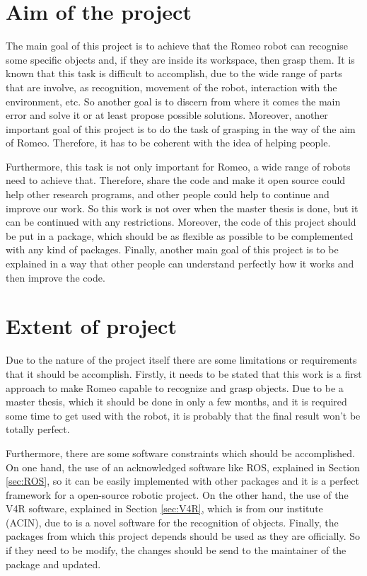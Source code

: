 \documentclass[12pt,a4paper,final,twoside,openright]{report}
\begin{document}
\section{Aim of the project}

The main goal of this project is to achieve that the Romeo robot can recognise some specific objects and, if they are inside its workspace, then grasp them. It is known that this task is difficult to accomplish, due to the wide range of parts that are involve, as recognition, movement of the robot, interaction with the environment, etc. So another goal is to discern from where it comes the main error and solve it or at least propose possible solutions. Moreover, another important goal of this project is to do the task of grasping in the way of the aim of Romeo. Therefore, it has to be coherent with the idea of helping people.

Furthermore, this task is not only important for Romeo, a wide range of robots need to achieve that. Therefore, share the code and make it open source could help other research programs, and other people could help to continue and improve our work. So this work is not over when the master thesis is done, but it can be continued with any restrictions. Moreover, the code of this project should be put in a package, which should be as flexible as possible to be complemented with any kind of packages. Finally, another main goal of this project is to be explained in a way that other people can understand perfectly how it works and then improve the code.

\section{Extent of project}

Due to the nature of the project itself there are some limitations or requirements that it should be accomplish. Firstly, it needs to be stated that this work is a first approach to make Romeo capable to recognize and grasp objects. Due to be a master thesis, which it should be done in only a few months, and it is required some time to get used with the robot, it is probably that the final result won't be totally perfect.

Furthermore, there are some software constraints which should be accomplished. On one hand, the use of an acknowledged software like ROS, explained in Section \ref{sec:ROS}, so it can be easily implemented with other packages and it is a perfect framework for a open-source robotic project. On the other hand, the use of the V4R software, explained in Section \ref{sec:V4R}, which is from our institute (ACIN), due to is a novel software for the recognition of objects. Finally, the packages from which this project depends should be used as they are officially. So if they need to be modify, the changes should be send to the maintainer of the package and updated.
\end{document}
